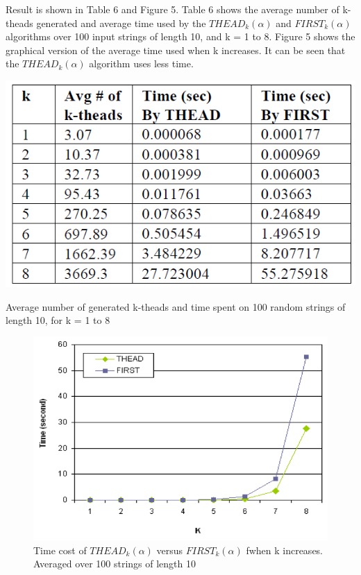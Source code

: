 \documentclass{sig-alternate-05-2015}
\begin{document}
Result is shown in Table 6 and Figure 5. Table 6 shows
the average number of k-theads generated and average time
used by the $THEAD_k(\alpha)$ and $FIRST_k(\alpha)$ algorithms over
100 input strings of length 10, and k = 1 to 8. Figure 5
shows the graphical version of the average time used when
k increases. It can be seen that the $THEAD_k(\alpha)$ algorithm
uses less time.

\begin{table}
\centering
\includegraphics[scale=0.5]{table6.PNG}
\caption{Average number of generated k-theads and time
spent on 100 random strings of length 10, for k = 1 to 8}
\label{table:6}
\end{table}

\begin{figure}
\centering
\includegraphics[scale=0.5]{figure5.PNG}
\caption{Time cost of $THEAD_k(\alpha)$ versus $FIRST_k(\alpha)$
fwhen k increases. Averaged over 100 strings of length 10}
\label{fig:5}
\end{figure}
\end{document}
